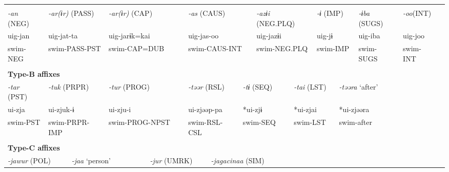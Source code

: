 \tabletail{}
\tablelasttail{}
\begin{tabularx}{\textwidth}{XXXXXXXXXXXXXXXXXXXX}
\lsptoprule
\multicolumn{20}{X}{{\bfseries Type-A affixes}}\\
{ \textit{{}-an} (NEG)} & \multicolumn{3}{X}{{ \textit{{}-ar(ɨr)} (PASS)}} & \multicolumn{3}{X}{{ \textit{{}-ar(ɨr)} (CAP)}} & \multicolumn{4}{X}{{ \textit{{}-as} (CAUS)}} & \multicolumn{4}{X}{{ \textit{{}-azɨi} (NEG.PLQ)}} & \multicolumn{2}{X}{{ \textit{{}-ɨ} (IMP)}} & { \textit{{}-ɨba} (SUGS)} & { \textit{{}-oo}(INT)} & \\
{ uig-jan} & \multicolumn{3}{X}{{ uig-jat-ta}} & \multicolumn{3}{X}{{ uig-jarɨk=kai}} & \multicolumn{4}{X}{{ uig-jas-oo}} & \multicolumn{4}{X}{{ uig-jazɨi}} & \multicolumn{2}{X}{{ uig-jɨ}} & { uig-iba} & { uig-joo} & \\
swim-NEG & \multicolumn{3}{X}{swim-PASS-PST} & \multicolumn{3}{X}{swim-CAP=DUB} & \multicolumn{4}{X}{swim-CAUS-INT} & \multicolumn{4}{X}{swim-NEG.PLQ} & \multicolumn{2}{X}{swim-IMP} & swim-SUGS & swim-INT & \\
\multicolumn{20}{X}{}\\
\multicolumn{20}{X}{{\bfseries Type-B affixes}}\\
{ \textit{{}-tar} (PST)} & \multicolumn{3}{X}{{ \textit{{}-tuk} (PRPR)}} & \multicolumn{3}{X}{{ \textit{{}-tur} (PROG)}} & \multicolumn{3}{X}{{ \textit{{}-təər} (RSL)}} & \multicolumn{3}{X}{{ \textit{{}-tɨ} (SEQ)}} & \multicolumn{3}{X}{{ \textit{{}-tai} (LST)}} & \multicolumn{4}{X}{{ \textit{{}-təəra} ‘after’}}\\
{ ui-zja} & \multicolumn{3}{X}{{ ui-zjuk-ɨ}} & \multicolumn{3}{X}{{ ui-zju-i}} & \multicolumn{3}{X}{{ ui-zjəəp-pa}} & \multicolumn{3}{X}{{ *ui-zjɨ}} & \multicolumn{3}{X}{{ *ui-zjai}} & \multicolumn{4}{X}{{ *ui-zjəəra}}\\
swim-PST & \multicolumn{3}{X}{swim-PRPR-IMP} & \multicolumn{3}{X}{swim-PROG-NPST} & \multicolumn{3}{X}{swim-RSL-CSL} & \multicolumn{3}{X}{swim-SEQ} & \multicolumn{3}{X}{swim-LST} & \multicolumn{4}{X}{{ swim-after}}\\
& \multicolumn{3}{X}{} & \multicolumn{3}{X}{} & \multicolumn{3}{X}{} & \multicolumn{3}{X}{} & \multicolumn{3}{X}{} & \multicolumn{4}{X}{}\\
\multicolumn{20}{X}{{\bfseries Type-C affixes}}\\
\multicolumn{3}{X}{{ \textit{{}-jawur} (POL)}} & \multicolumn{2}{X}{{ \textit{{}-jaa} ‘person’}} & \multicolumn{3}{X}{{ \textit{{}-jur} (UMRK)}} & \multicolumn{4}{X}{{ \textit{{}-jagacinaa} (SIM)}} & \multicolumn{8}{X}{}\\

\end{tabularx}
